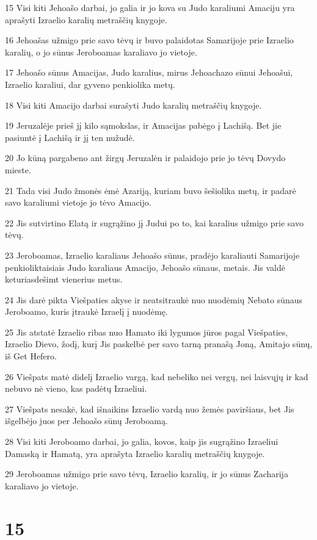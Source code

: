 \par 15 Visi kiti Jehoašo darbai, jo galia ir jo kova su Judo karaliumi Amaciju yra aprašyti Izraelio karalių metraščių knygoje. 
\par 16 Jehoašas užmigo prie savo tėvų ir buvo palaidotas Samarijoje prie Izraelio karalių, o jo sūnus Jeroboamas karaliavo jo vietoje. 
\par 17 Jehoašo sūnus Amacijas, Judo karalius, mirus Jehoachazo sūnui Jehoašui, Izraelio karaliui, dar gyveno penkiolika metų. 
\par 18 Visi kiti Amacijo darbai surašyti Judo karalių metraščių knygoje. 
\par 19 Jeruzalėje prieš jį kilo sąmokslas, ir Amacijas pabėgo į Lachišą. Bet jie pasiuntė į Lachišą ir jį ten nužudė. 
\par 20 Jo kūną pargabeno ant žirgų Jeruzalėn ir palaidojo prie jo tėvų Dovydo mieste. 
\par 21 Tada visi Judo žmonės ėmė Azariją, kuriam buvo šešiolika metų, ir padarė savo karaliumi vietoje jo tėvo Amacijo. 
\par 22 Jis sutvirtino Elatą ir sugrąžino jį Judui po to, kai karalius užmigo prie savo tėvų. 
\par 23 Jeroboamas, Izraelio karaliaus Jehoašo sūnus, pradėjo karaliauti Samarijoje penkioliktaisiais Judo karaliaus Amacijo, Jehoašo sūnaus, metais. Jis valdė keturiasdešimt vienerius metus. 
\par 24 Jis darė pikta Viešpaties akyse ir neatsitraukė nuo nuodėmių Nebato sūnaus Jeroboamo, kuris įtraukė Izraelį į nuodėmę. 
\par 25 Jis atstatė Izraelio ribas nuo Hamato iki lygumos jūros pagal Viešpaties, Izraelio Dievo, žodį, kurį Jis paskelbė per savo tarną pranašą Joną, Amitajo sūnų, iš Get Hefero. 
\par 26 Viešpats matė didelį Izraelio vargą, kad nebeliko nei vergų, nei laisvųjų ir kad nebuvo nė vieno, kas padėtų Izraeliui. 
\par 27 Viešpats nesakė, kad išnaikins Izraelio vardą nuo žemės paviršiaus, bet Jis išgelbėjo juos per Jehoašo sūnų Jeroboamą. 
\par 28 Visi kiti Jeroboamo darbai, jo galia, kovos, kaip jis sugrąžino Izraeliui Damaską ir Hamatą, yra aprašyta Izraelio karalių metraščių knygoje. 
\par 29 Jeroboamas užmigo prie savo tėvų, Izraelio karalių, ir jo sūnus Zacharija karaliavo jo vietoje.



\chapter{15}

